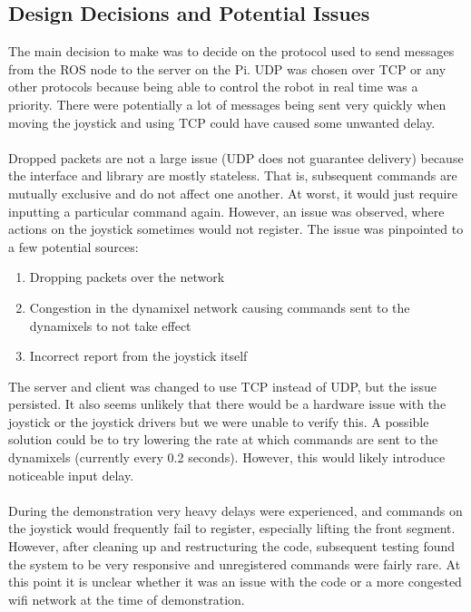 \documentclass[]{article}
\begin{document}
\subsection{Design Decisions and Potential Issues}
The main decision to make was to decide on the protocol used to send messages from the ROS node to the server on the Pi. UDP was chosen over TCP or any other protocols because being able to control the robot in real time was a priority. There were potentially a lot of messages being sent very quickly when moving the joystick and using TCP could have caused some unwanted delay.
\\
\\
Dropped packets are not a large issue (UDP does not guarantee delivery) because the interface and library are mostly stateless. That is, subsequent commands are mutually exclusive and do not affect one another. At worst, it would just require inputting a particular command again. However, an issue was observed, where actions on the joystick sometimes would not register. The issue was pinpointed to a few potential sources:
\begin{enumerate}
  \item Dropping packets over the network
  \item Congestion in the dynamixel network causing commands sent to the dynamixels to not take effect
  \item Incorrect report from the joystick itself
\end{enumerate}
The server and client was changed to use TCP instead of UDP, but the issue persisted. It also seems unlikely that there would be a hardware issue with the joystick or the joystick drivers but we were unable to verify this. A possible solution could be to try lowering the rate at which commands are sent to the dynamixels (currently every 0.2 seconds). However, this would likely introduce noticeable input delay.
\\
\\
During the demonstration very heavy delays were experienced, and commands on the joystick would frequently fail to register, especially lifting the front segment. However, after cleaning up and restructuring the code, subsequent testing found the system to be very responsive and unregistered commands were fairly rare. At this point it is unclear whether it was an issue with the code or a more congested wifi network at the time of demonstration.
\end{document}
